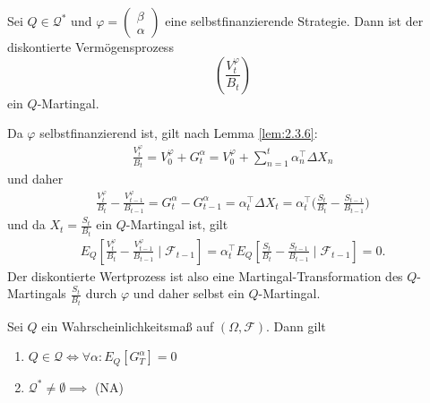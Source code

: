 \documentclass[a4paper,twoside,DIV15,BCOR12mm]{scrbook}
\newcommand{\cF}{\mathcal F}
\newcommand{\cQ}{\mathcal Q}
\begin{document}
\begin{satz}
Sei $Q\in \cQ^*$ und \label{satz:2.5.1}
$\varphi=\left(\begin{smallmatrix} \beta \\ \alpha \end{smallmatrix}\right)$ 
eine selbstfinanzierende Strategie. Dann ist der diskontierte Vermögensprozess
\[
\left(\frac{V_t^\varphi}{B_t}\right)
\]
ein $Q$-Martingal.
\end{satz}
\begin{beweis}
Da $\varphi$ selbstfinanzierend ist, gilt nach Lemma \ref{lem:2.3.6}:
\begin{align*}
\frac{V_t^\varphi}{B_t} = V_0^\varphi + G_t^\alpha = V_0^\varphi + \sum_{n=1}^t \alpha_n^\top \Delta X_n
\end{align*}
und daher
\begin{align*}
\frac{V_t^\varphi}{B_t} - \frac{V_{t-1}^\varphi}{B_{t-1}}
= G_t^\alpha - G_{t-1}^\alpha = \alpha_t^\top \Delta X_t = \alpha_t^\top \bigg(\frac{S_t}{B_t} - \frac{S_{t-1}}{B_{t-1}}\bigg)
\end{align*}
und da $X_t = \frac{S_t}{B_t}$ ein $Q$-Martingal ist, gilt 
\begin{align*}
E_Q[\frac{V_t^\varphi}{B_t} - \frac{V_{t-1}^\varphi}{B_{t-1}}\mid \cF_{t-1}]
= \alpha^\top_t E_Q[\frac{S_t}{B_t} - \frac{S_{t-1}}{B_{t-1}}\mid \cF_{t-1}] = 0.
\end{align*}
Der diskontierte Wertprozess ist also eine Martingal-Transformation des $Q$-Martingals $\frac{S_t}{B_t}$ durch $\varphi$ und daher selbst ein $Q$-Martingal.
\end{beweis}

\begin{satz}
Sei $Q$ ein Wahrscheinlichkeitsmaß auf $(\Omega,\cF)$. Dann gilt\label{satz:2.5.2}
\begin{enumerate}
\item $Q\in \cQ\iff \forall \alpha: E_Q[G^\alpha_T]=0$
\item $\cQ^*\ne \emptyset \implies$ (NA)
\end{enumerate}
\end{satz}
\end{document}
